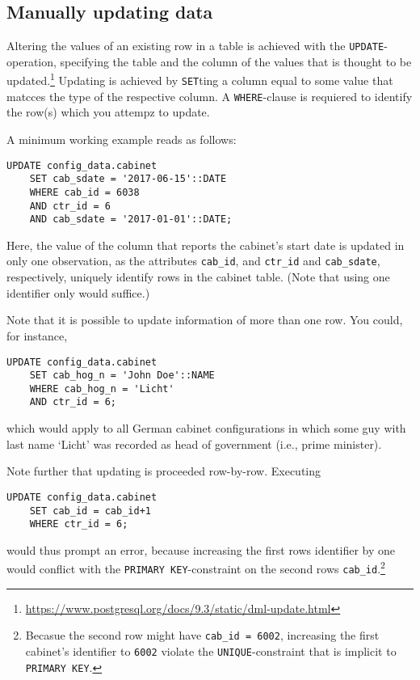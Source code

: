 \subsection{Manually updating data}\label{subsec_manually_updating_data}

Altering the values of an existing row in a table is achieved with the \texttt{UPDATE}-operation, specifying the table and the column of the values that is thought to be updated.\footnote{\url{https://www.postgresql.org/docs/9.3/static/dml-update.html}}
Updating is achieved by \texttt{SET}ting a column equal to some value that matcces the type of the respective column.
A \texttt{WHERE}-clause is requiered to identify the row(s) which you attempz to update. 

A minimum working example reads as follows:
\begin{lstlisting}[language=postgreSQL]
UPDATE config_data.cabinet 
	SET cab_sdate = '2017-06-15'::DATE 
	WHERE cab_id = 6038 
	AND ctr_id = 6 
	AND cab_sdate = '2017-01-01'::DATE;
\end{lstlisting}

Here, the value of the column that reports the cabinet's start date is updated in only one observation, as the attributes \texttt{cab\_id}, and \texttt{ctr\_id} and \texttt{cab\_sdate}, respectively, uniquely identify rows in the cabinet table. (Note that using one identifier only would suffice.)

Note that it is possible to update information of more than one row. 
You could, for instance, 
\begin{lstlisting}[language=postgreSQL]
UPDATE config_data.cabinet 
	SET cab_hog_n = 'John Doe'::NAME 
	WHERE cab_hog_n = 'Licht'
	AND ctr_id = 6;
\end{lstlisting}
which would apply to all German cabinet configurations in which some guy with last name `Licht' was recorded as head of government (i.e., prime minister).

Note further that updating is proceeded row-by-row. Executing
\begin{lstlisting}[language=postgreSQL]
UPDATE config_data.cabinet 
	SET cab_id = cab_id+1
	WHERE ctr_id = 6;
\end{lstlisting}
would thus prompt an error, because increasing the first rows identifier by one would conflict with the \texttt{PRIMARY KEY}-constraint on the second rows \texttt{cab\_id}.\footnote{Becasue the second row might have \texttt{cab\_id = 6002}, increasing the first cabinet's identifier to \texttt{6002} violate the \texttt{UNIQUE}-constraint that is implicit to \texttt{PRIMARY KEY}.}

